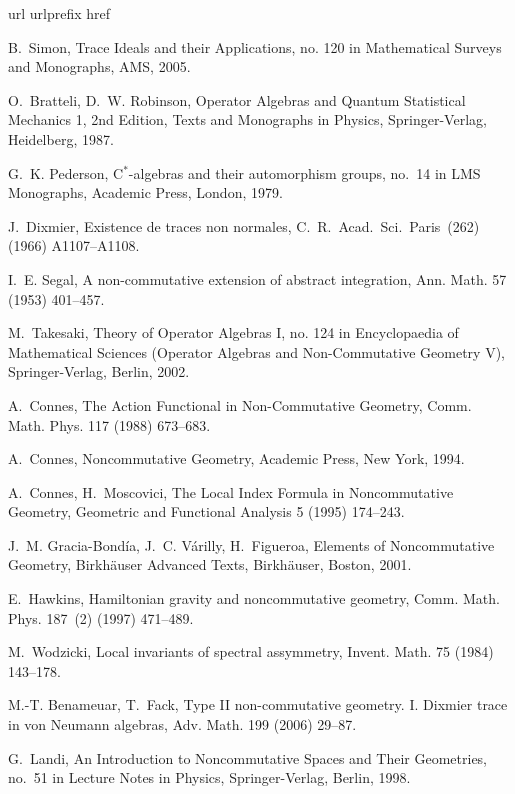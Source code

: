 \documentclass[final,1p]{elsarticle}
\numberwithin{equation}{section}
\theoremstyle{plain}
\theoremstyle{definition}
\begin{document}
\begin{thebibliography}{10}
\expandafter\ifx\csname url\endcsname\relax
  \fi
\expandafter\ifx\csname urlprefix\endcsname\relax\fi
\expandafter\ifx\csname href\endcsname\relax
   \fi

B.~Simon, Trace Ideals and their Applications, no. 120 in Mathematical Surveys
  and Monographs, AMS, 2005.

O.~Bratteli, D.~W. Robinson, Operator Algebras and Quantum Statistical
  Mechanics 1, 2nd Edition, Texts and Monographs in Physics, Springer-Verlag,
  Heidelberg, 1987.

G.~K. Pederson, C$^*$-algebras and their automorphism groups, no.~14 in LMS
  Monographs, Academic Press, London, 1979.

J.~Dixmier, Existence de traces non normales, C.~R.~Acad.~Sci.~Paris~(262)
  (1966) A1107--A1108.

I.~E. Segal, A non-commutative extension of abstract integration, Ann. Math. 57
  (1953) 401--457.

M.~Takesaki, Theory of Operator Algebras I, no. 124 in Encyclopaedia of
  Mathematical Sciences (Operator Algebras and Non-Commutative Geometry V),
  Springer-Verlag, Berlin, 2002.

A.~Connes, The {A}ction {F}unctional in {N}on-{C}ommutative {G}eometry, Comm.
  Math. Phys. 117 (1988) 673--683.

A.~Connes, Noncommutative Geometry, Academic Press, New York, 1994.

A.~Connes, H.~Moscovici, The {L}ocal {I}ndex {F}ormula in {N}oncommutative
  {G}eometry, Geometric and Functional Analysis 5 (1995) 174--243.

J.~M. Gracia-Bond{\'{i}}a, J.~C. V{\'{a}}rilly, H.~Figueroa, Elements of
  Noncommutative Geometry, Birkh{\"{a}}user Advanced Texts, Birkh{\"{a}}user,
  Boston, 2001.

E.~Hawkins, Hamiltonian gravity and noncommutative geometry, Comm. Math. Phys.
  187~(2) (1997) 471--489.

M.~Wodzicki, Local invariants of spectral assymmetry, Invent. Math. 75 (1984)
  143--178.

M.-T. Benameuar, T.~Fack, Type {II} non-commutative geometry. {I}. {D}ixmier
  trace in von {N}eumann algebras, Adv. Math. 199 (2006) 29--87.

G.~Landi, An Introduction to Noncommutative Spaces and Their Geometries, no.~51
  in Lecture Notes in Physics, Springer-Verlag, Berlin, 1998.


\end{thebibliography}
\end{document}
